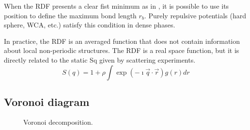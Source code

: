 When the \ac{RDF} presents a clear fist minimum as in , it is possible to use its position to define the maximum bond length $r_b$. Purely repulsive potentials (hard sphere, \ac{WCA}, etc.) satisfy this condition in dense phases.

In practice, the \ac{RDF} is an averaged function that does not contain information about local non-periodic structures. The \ac{RDF} is a real space function, but it is directly related to the static \ac{Sq} given by scattering experiments.
\begin{equation}
	S(q) = 1 + \rho \int {\exp{(-\imath \vec{q}\cdot\vec{r})} g(r)dr}
	\label{eq:rdf2Sq}
\end{equation}



\subsection{Voronoi diagram}

\begin{figure}
	\centering
	\caption{Voronoi decomposition.}
	\label{fig:voro}
\end{figure}

